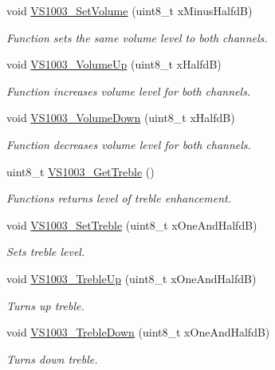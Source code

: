 \begin{DoxyCompactItemize}
\item 
void \hyperlink{group___v_s1003_gad9b32a2a7d63b711fc17d148604e3eab}{VS1003\_\-SetVolume} (uint8\_\-t xMinusHalfdB)
\begin{DoxyCompactList}\small\item\em Function sets the same volume level to both channels. \end{DoxyCompactList}\item 
void \hyperlink{group___v_s1003_ga4f95ce5237dcdc657dfa89517aab0cb9}{VS1003\_\-VolumeUp} (uint8\_\-t xHalfdB)
\begin{DoxyCompactList}\small\item\em Function increases volume level for both channels. \end{DoxyCompactList}\item 
void \hyperlink{group___v_s1003_gae47ed2e7d38334207d3b82e228a0d499}{VS1003\_\-VolumeDown} (uint8\_\-t xHalfdB)
\begin{DoxyCompactList}\small\item\em Function decreases volume level for both channels. \end{DoxyCompactList}\item 
uint8\_\-t \hyperlink{group___v_s1003_ga82d6c7066995fa8e0f395086189c8ac4}{VS1003\_\-GetTreble} ()
\begin{DoxyCompactList}\small\item\em Functions returns level of treble enhancement. \end{DoxyCompactList}\item 
void \hyperlink{group___v_s1003_gaf1911e05279d10489cc24fa01c247ef9}{VS1003\_\-SetTreble} (uint8\_\-t xOneAndHalfdB)
\begin{DoxyCompactList}\small\item\em Sets treble level. \end{DoxyCompactList}\item 
void \hyperlink{group___v_s1003_ga417954b454482b4df25b52532671e59e}{VS1003\_\-TrebleUp} (uint8\_\-t xOneAndHalfdB)
\begin{DoxyCompactList}\small\item\em Turns up treble. \end{DoxyCompactList}\item 
void \hyperlink{group___v_s1003_ga43bb27c62418f64554a40effe99f8de0}{VS1003\_\-TrebleDown} (uint8\_\-t xOneAndHalfdB)
\begin{DoxyCompactList}\small\item\em Turns down treble. \end{DoxyCompactList}\item 

\end{DoxyCompactItemize}
